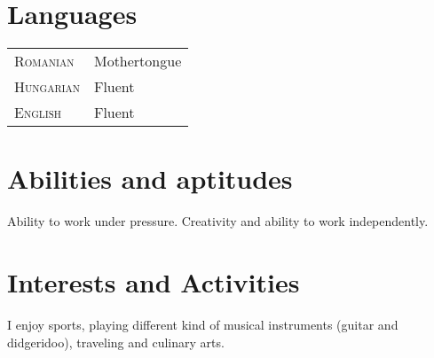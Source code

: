 \documentclass[a4paper,10pt]{article}
\begin{document}
\section{Languages}
\begin{tabular}{p{2.5cm}p{11cm}}
\textsc{Romanian}&Mothertongue\\
\textsc{Hungarian}& Fluent\\
\textsc{English}& Fluent\\
\end{tabular}

\section{Abilities and aptitudes}
Ability to work under pressure.
Creativity and ability to work independently.

\section{Interests and Activities}
I enjoy sports, playing different kind of musical instruments (guitar and
didgeridoo), traveling and culinary arts.


\end{document}
